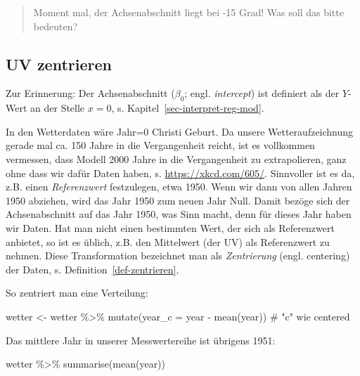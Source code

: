 \documentclass[
  letterpaper,
  oneside,
  open=any]{scrbook}
\newenvironment{Shaded}{\begin{snugshade}}{\end{snugshade}}
\newcommand{\AttributeTok}[1]{\textcolor[rgb]{0.40,0.45,0.13}{#1}}
\newcommand{\CommentTok}[1]{\textcolor[rgb]{0.37,0.37,0.37}{#1}}
\newcommand{\FunctionTok}[1]{\textcolor[rgb]{0.28,0.35,0.67}{#1}}
\newcommand{\NormalTok}[1]{\textcolor[rgb]{0.00,0.23,0.31}{#1}}
\newcommand{\OtherTok}[1]{\textcolor[rgb]{0.00,0.23,0.31}{#1}}
\newcommand{\SpecialCharTok}[1]{\textcolor[rgb]{0.37,0.37,0.37}{#1}}
\theoremstyle{definition}
\theoremstyle{definition}
\theoremstyle{definition}
\theoremstyle{remark}
\begin{document}
\begin{quote}
{} Moment mal, der Achsenabschnitt liegt bei -15 Grad!
Was soll das bitte bedeuten?
\end{quote}

\subsection{UV zentrieren}\label{uv-zentrieren}

Zur Erinnerung: Der Achsenabschnitt (\(\beta_0\); engl.
\emph{intercept}) ist definiert als der \(Y\)-Wert an der Stelle
\(x=0\), s. Kapitel~\ref{sec-interpret-reg-mod}.

In den Wetterdaten wäre Jahr=0 Christi Geburt. Da unsere
Wetteraufzeichnung gerade mal ca. 150 Jahre in die Vergangenheit reicht,
ist es vollkommen vermessen, dass Modell 2000 Jahre in die Vergangenheit
zu extrapolieren, ganz ohne dass wir dafür Daten haben, s.
\url{https://xkcd.com/605/}. Sinnvoller ist es da, z.B. einen
\emph{Referenzwert} festzulegen, etwa 1950. Wenn wir dann von allen
Jahren 1950 abziehen, wird das Jahr 1950 zum neuen Jahr Null. Damit
bezöge sich der Achsenabschnitt auf das Jahr 1950, was Sinn macht, denn
für dieses Jahr haben wir Daten. Hat man nicht einen bestimmten Wert,
der sich als Referenzwert anbietet, so ist es üblich, z.B. den
Mittelwert (der UV) als Referenzwert zu nehmen. Diese Transformation
bezeichnet man als \emph{Zentrierung} (engl. centering) der Daten, s.
Definition~\ref{def-zentrieren}.

So zentriert man eine Verteilung:

\begin{Shaded}
\begin{Highlighting}[]
\NormalTok{wetter }\OtherTok{\textless{}{-}}
\NormalTok{  wetter }\SpecialCharTok{\%\textgreater{}\%} 
  \FunctionTok{mutate}\NormalTok{(}\AttributeTok{year\_c =}\NormalTok{ year }\SpecialCharTok{{-}} \FunctionTok{mean}\NormalTok{(year))  }\CommentTok{\# "c" wie centered}
\end{Highlighting}
\end{Shaded}

Das mittlere Jahr in unserer Messwertereihe ist übrigens 1951:

\begin{Shaded}
\begin{Highlighting}[]
\NormalTok{wetter }\SpecialCharTok{\%\textgreater{}\%} 
  \FunctionTok{summarise}\NormalTok{(}\FunctionTok{mean}\NormalTok{(year))}
\end{Highlighting}
\end{Shaded}
\end{document}
